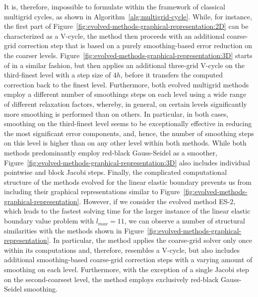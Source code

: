 It is, therefore, impossible to formulate within the framework of classical multigrid cycles, as shown in Algorithm~\ref{alg:multigrid-cycle}.
While, for instance, the first part of Figure~\ref{fig:evolved-methods-graphical-representation:2D} can be characterized as a V-cycle, the method then proceeds with an additional coarse-grid correction step that is based on a purely smoothing-based error reduction on the coarser levels.
Figure~\ref{fig:evolved-methods-graphical-representation:3D} starts of in a similar fashion, but then applies an additional three-grid V-cycle on the third-finest level with a step size of $4h$, before it transfers the computed correction back to the finest level.
Furthermore, both evolved multigrid methods employ a different number of smoothings steps on each level using a wide range of different relaxation factors, whereby, in general, on certain levels significantly more smoothing is performed than on others.
In particular, in both cases, smoothing on the third-finest level seems to be exceptionally effective in reducing the most significant error components, and, hence, the number of smoothing steps on this level is higher than on any other level within both methods.
While both methods predominantly employ red-black Gauss-Seidel as a smoother, Figure~\ref{fig:evolved-methods-graphical-representation:3D} also includes individual pointwise and block Jacobi steps.
Finally, the complicated computational structure of the methods evolved for the linear elastic boundary prevents us from including their graphical representations similar to Figure~\ref{fig:evolved-methods-graphical-representation}.
However, if we consider the evolved method ES-2, which leads to the fastest solving time for the larger instance of the linear elastic boundary value problem with $l_{max} = 11$, we can observe a number of structural similarities with the methods shown in Figure~\ref{fig:evolved-methods-graphical-representation}.
In particular, the method applies the coarse-grid solver only once within its computations and, therefore, resembles a V-cycle, but also includes additional smoothing-based coarse-grid correction steps with a varying amount of smoothing on each level.
Furthermore, with the exception of a single Jacobi step on the second-coarsest level, the method employs exclusively red-black Gauss-Seidel smoothing.
